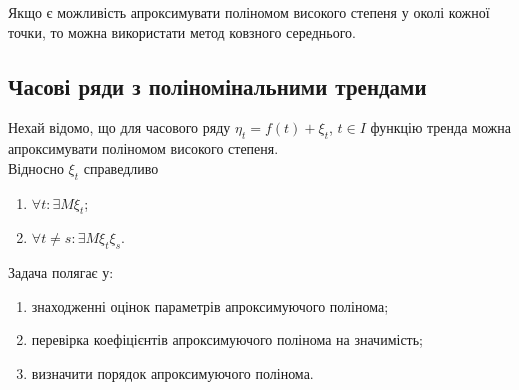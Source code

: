 Якщо є можливість апроксимувати поліномом високого степеня у околі кожної точки, то можна використати метод ковзного середнього. 

\subsection{Часові ряди з поліномінальними трендами}

Нехай відомо, що для часового ряду $\eta_t = f(t) + \xi_t$, $t\in I$ функцію тренда можна апроксимувати поліномом високого степеня. \\

Відносно $\xi_t$ справедливо
\begin{enumerate}
	\item $\forall t:\exists M\xi_t$;
	\item $\forall t\ne s:\exists M\xi_t\xi_s$.
\end{enumerate}

Задача полягає у:
\begin{enumerate}
	\item знаходженні оцінок параметрів апроксимуючого полінома;
	\item перевірка коефіцієнтів апроксимуючого полінома на значимість;
	\item визначити порядок апроксимуючого полінома.
\end{enumerate}